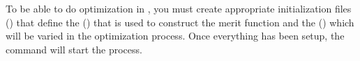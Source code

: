 \documentclass{hitec}
\begin{document}
To be able to do optimization in \tao, you must create appropriate initialization files
() that define the  () that is used to construct the merit
function and the  () which will be varied in the optimization
process. Once everything has been setup, the  command will start the 
process.
\end{document}
